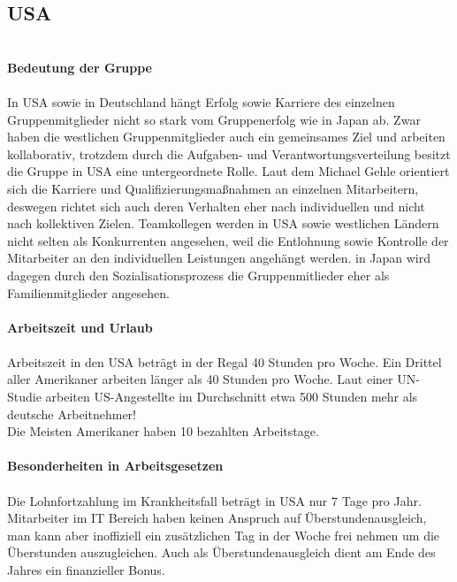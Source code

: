 	\subsection{USA}\\
	\textbf{Bedeutung der Gruppe}\\
	\\
	In USA sowie in Deutschland hängt Erfolg sowie Karriere des einzelnen Gruppenmitglieder nicht so stark vom Gruppenerfolg wie in Japan ab. Zwar haben die westlichen Gruppenmitglieder auch ein gemeinsames Ziel und arbeiten kollaborativ, trotzdem durch die Aufgaben- und Verantwortungsverteilung besitzt die Gruppe in USA eine untergeordnete Rolle. Laut dem Michael Gehle orientiert sich die  Karriere und Qualifizierungsmaßnahmen an einzelnen Mitarbeitern, deswegen richtet sich auch deren Verhalten eher nach individuellen und nicht nach kollektiven Zielen. 
	Teamkollegen werden in USA sowie westlichen Ländern nicht selten als Konkurrenten angesehen, weil die Entlohnung sowie Kontrolle der Mitarbeiter an den individuellen Leistungen angehängt werden. in Japan wird dagegen durch den Sozialisationsprozess die Gruppenmitlieder eher als Familienmitglieder angesehen.\\
	 \\
		\textbf{Arbeitszeit und Urlaub}\\
		\\ 
	Arbeitszeit in den USA beträgt in der Regal 40 Stunden pro Woche. 
	Ein Drittel aller Amerikaner arbeiten länger als 40 Stunden pro Woche.
	Laut einer UN-Studie arbeiten US-Angestellte im Durchschnitt etwa 500 Stunden mehr als deutsche Arbeitnehmer!
	\\Die Meisten Amerikaner haben 10 bezahlten Arbeitstage.
	\\
	\\	\textbf{Besonderheiten in Arbeitsgesetzen}\\
		\\
		Die Lohnfortzahlung im Krankheitsfall beträgt in USA nur 7 Tage pro Jahr. 
		Mitarbeiter im IT Bereich haben keinen Anspruch auf Überstundenausgleich, man kann aber inoffiziell ein zusätzlichen Tag in der Woche frei nehmen um die Überstunden auszugleichen. Auch als Überstundenausgleich dient am Ende des Jahres ein finanzieller Bonus.
